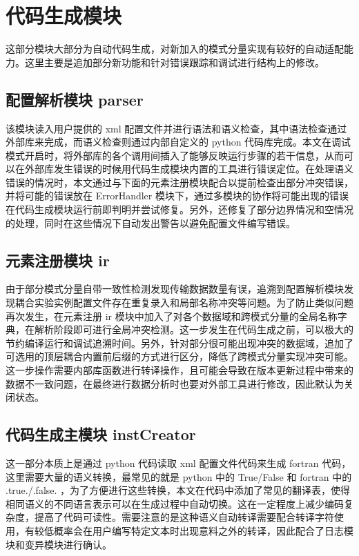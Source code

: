 \section{代码生成模块}

这部分模块大部分为自动代码生成，对新加入的模式分量实现有较好的自动适配能力。这里主要是追加部分新功能和针对错误跟踪和调试进行结构上的修改。

\subsection{配置解析模块 parser}

该模块读入用户提供的 xml 配置文件并进行语法和语义检查，其中语法检查通过外部库来完成，而语义检查则通过内部自定义的 python 代码库完成。本文在调试模式开启时，将外部库的各个调用间插入了能够反映运行步骤的若干信息，从而可以在外部库发生错误的时候用代码生成模块内置的工具进行错误定位。在处理语义错误的情况时，本文通过与下面的元素注册模块配合以提前检查出部分冲突错误，并将可能的错误放在 ErrorHandler 模块下，通过多模块的协作将可能出现的错误在代码生成模块运行前即判明并尝试修复。另外，还修复了部分边界情况和空情况的处理，同时在这些情况下自动发出警告以避免配置文件编写错误。

\subsection{元素注册模块 ir}

由于部分模式分量自带一致性检测发现传输数据数量有误，追溯到配置解析模块发现耦合实验实例配置文件存在重复录入和局部名称冲突等问题。为了防止类似问题再次发生，在元素注册 ir 模块中加入了对各个数据域和跨模式分量的全局名称字典，在解析阶段即可进行全局冲突检测。这一步发生在代码生成之前，可以极大的节约编译运行和调试追溯时间。另外，针对部分很可能出现冲突的数据域，追加了可选用的顶层耦合内置前后缀的方式进行区分，降低了跨模式分量实现冲突可能。这一步操作需要内部库函数进行转译操作，且可能会导致在版本更新过程中带来的数据不一致问题，在最终进行数据分析时也要对外部工具进行修改，因此默认为关闭状态。

\subsection{代码生成主模块 instCreator}

这一部分本质上是通过 python 代码读取 xml 配置文件代码来生成 fortran 代码，这里需要大量的语义转换，最常见的就是 python 中的 True/False 和 fortran 中的 .true./.false. ，为了方便进行这些转换，本文在代码中添加了常见的翻译表，使得相同语义的不同语言表示可以在生成过程中自动切换。这在一定程度上减少编码复杂度，提高了代码可读性。需要注意的是这种语义自动转译需要配合转译字符使用，有较低概率会在用户编写特定文本时出现意料之外的转译，因此配合了日志模块和变异模块进行确认。

